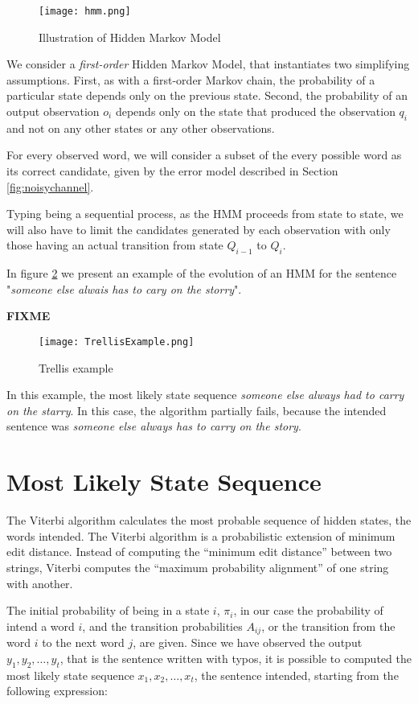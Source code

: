 \begin{figure}[H]
	\centering
	\texttt{[image: hmm.png]}
	\caption{Illustration of Hidden Markov Model}
	\label{fig:hmm}
\end{figure}

We consider a \textit{first-order} Hidden Markov Model, that instantiates two simplifying assumptions. First, as 
with a first-order Markov chain, the probability of a particular state depends only on the previous state. Second, 
the probability of an output observation $o_i$ depends only on the state that produced the observation $q_i$ 
and not on any other states or any other observations.

For every observed word, we will consider a subset of the every possible word as its correct candidate, given by 
the error model described in Section \ref{fig:noisychannel}.

Typing being a sequential process, as the HMM proceeds from state to state, we will also have to limit the 
candidates generated by each observation with only those having an actual transition from state $Q_{i-1}$ to 
$Q_i$.

In figure \ref{fig:trellis} we present an example of the evolution of an HMM for the sentence "\textsl{someone 
	else alwais has to cary on the storry}".

\textbf{FIXME}
\begin{figure}[H]
	\centering
	\texttt{[image: TrellisExample.png]}
	\caption{Trellis example}
	\label{fig:trellis}
\end{figure}

In this example, the most likely state sequence \textsl{someone else always had to carry on the starry}. In this 
case, the algorithm partially fails, because the intended sentence was \textsl{someone else always has to carry 
	on the story}.


\section{Most Likely State Sequence}

The Viterbi algorithm calculates the most probable sequence of hidden states, the words intended.
The Viterbi algorithm is a probabilistic extension of minimum edit distance. Instead of computing the “minimum 
edit distance” between two strings, Viterbi computes the “maximum probability alignment” of one string with 
another. 

The initial probability of being in a state $i$, $\pi_i$, in our case the probability of intend a word $i$, and the 
transition probabilities $A_{ij}$, or the transition from the word $i$ to the next word $j$, are given. Since we have 
observed the output $y_1, y_2, \dots , y_t$, that is the sentence written with typos, it is possible to computed the most 
likely state sequence $x_1, x_2, \dots , x_t$, the sentence intended, starting from the following expression:

